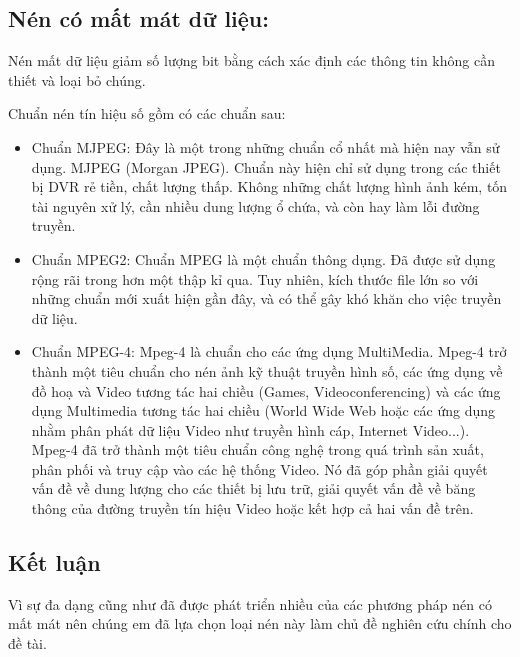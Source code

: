 \subsection{Nén có mất mát dữ liệu:}

Nén mất dữ liệu giảm số lượng bit bằng cách xác định các thông tin không cần thiết
và loại bỏ chúng.

Chuẩn nén tín hiệu số gồm có các chuẩn sau:

\begin{itemize}
      \item Chuẩn MJPEG:
            Đây là một trong những chuẩn cổ nhất mà hiện nay vẫn sử dụng. MJPEG (Morgan JPEG). Chuẩn này hiện chỉ sử dụng trong các thiết bị DVR rẻ tiền, chất lượng thấp. Không những chất lượng hình ảnh kém, tốn tài nguyên xử lý, cần nhiều dung lượng ổ chứa, và còn hay làm lỗi đường truyền.
      \item Chuẩn MPEG2:
            Chuẩn MPEG là một chuẩn thông dụng. Đã được sử dụng rộng rãi trong hơn một thập kỉ qua. Tuy nhiên, kích thước file lớn so với những chuẩn mới xuất hiện gần đây, và có thể gây khó khăn cho việc truyền dữ liệu.
      \item Chuẩn MPEG-4:
            Mpeg-4 là chuẩn cho các ứng dụng MultiMedia. Mpeg-4 trở thành một tiêu chuẩn cho nén ảnh kỹ thuật truyền hình số, các ứng dụng về đồ hoạ và Video tương tác hai chiều (Games, Videoconferencing) và các ứng dụng Multimedia tương tác hai chiều (World Wide Web hoặc các ứng dụng nhằm phân phát dữ liệu Video như truyền hình cáp, Internet Video...). Mpeg-4 đã trở thành một tiêu chuẩn công nghệ trong quá trình sản xuất, phân phối và truy cập vào các hệ thống Video. Nó đã góp phần giải quyết vấn đề về dung lượng cho các thiết bị lưu trữ, giải quyết vấn đề về băng thông của đường truyền tín hiệu Video hoặc kết hợp cả hai vấn đề trên.
      

\end{itemize}

\subsection{Kết luận}

Vì sự đa dạng cũng như đã được phát triển nhiều của các phương pháp nén có mất mát nên chúng em
đã lựa chọn loại nén này làm chủ đề nghiên cứu chính cho đề tài. 

